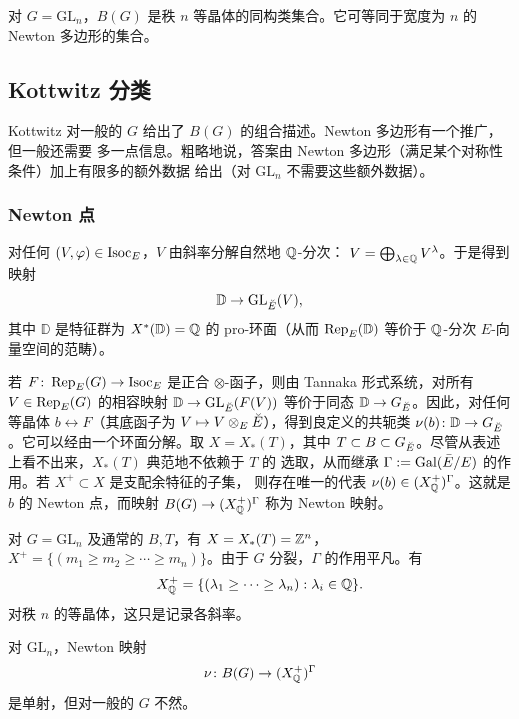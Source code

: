 \begin{example}
对 $G=\mathrm{GL}_n$，$B(G)$ 是秩 $n$ 等晶体的同构类集合。它可等同于宽度为 $n$ 的
Newton 多边形的集合。
\end{example}

\subsection{Kottwitz 分类}

Kottwitz 对一般的 $G$ 给出了 $B(G)$ 的组合描述。Newton 多边形有一个推广，但一般还需要
多一点信息。粗略地说，答案由 Newton 多边形（满足某个对称性条件）加上有限多的额外数据
给出（对 $\mathrm{GL}_n$ 不需要这些额外数据）。

\subsubsection{Newton 点}

对任何 $(V,\varphi)\in\operatorname{Isoc}_E$，$V$ 由斜率分解自然地 $\mathbb{Q}$-分次：
$V=\bigoplus_{\lambda\in\mathbb{Q}}V^\lambda$。于是得到映射
\[
\mathbb{D}\to\mathrm{GL}_{\breve{E}}(V),
\]
其中 $\mathbb{D}$ 是特征群为 $X^*(\mathbb{D})=\mathbb{Q}$ 的 pro-环面（从而
$\operatorname{Rep}_E(\mathbb{D})$ 等价于 $\mathbb{Q}$-分次 $E$-向量空间的范畴）。

若 $F\colon\operatorname{Rep}_E(G)\to\operatorname{Isoc}_E$ 是正合 $\otimes$-函子，则由 Tannaka 形式系统，对所有
$V\in\operatorname{Rep}_E(G)$ 的相容映射 $\mathbb{D}\to\mathrm{GL}_{\breve{E}}(F(V))$ 等价于同态
$\mathbb{D}\to G_{\breve{E}}$。因此，对任何等晶体 $b\leftrightarrow F$（其底函子为
$V\mapsto V\otimes_E\breve{E}$），得到良定义的共轭类
$\nu(b)\colon\mathbb{D}\to G_{\breve{E}}$。它可以经由一个环面分解。取 $X=X_*(T)$，其中
$T\subset B\subset G_{\breve{E}}$。尽管从表述上看不出来，$X_*(T)$ 典范地不依赖于 $T$ 的
选取，从而继承 $\Gamma:=\operatorname{Gal}(\bar E/E)$ 的作用。若 $X^+\subset X$ 是支配余特征的子集，
则存在唯一的代表 $\nu(b)\in(X^+_{\mathbb{Q}})^\Gamma$。这就是 $b$ 的 Newton 点，而映射
$B(G)\to(X^+_{\mathbb{Q}})^\Gamma$ 称为 Newton 映射。

\begin{example}
对 $G=\mathrm{GL}_n$ 及通常的 $B,T$，有 $X=X_*(T)=\mathbb{Z}^n$，
$X^+=\{(m_1\ge m_2\ge\cdots\ge m_n)\}$。由于 $G$ 分裂，$\Gamma$ 的作用平凡。有
\[
X^+_{\mathbb{Q}}=\{(\lambda_1\ge\cdots\ge\lambda_n):\lambda_i\in\mathbb{Q}\}.
\]
对秩 $n$ 的等晶体，这只是记录各斜率。
\end{example}

\begin{example}
对 $\mathrm{GL}_n$，Newton 映射
\[
\nu\colon B(G)\to(X^+_{\mathbb{Q}})^\Gamma
\]
是单射，但对一般的 $G$ 不然。
\end{example}

